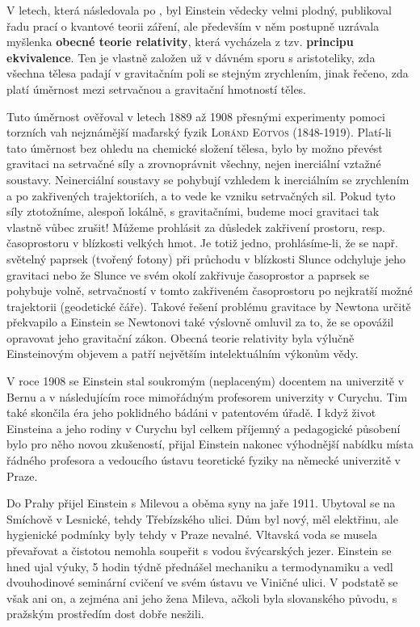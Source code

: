         V letech, která následovala po \emph{}, byl Einstein vědecky velmi
        plodný, publikoval řadu prací o kvantové teorii záření, ale především v něm postupně
        uzrávala myšlenka \textbf{obecné teorie relativity}, která vycházela z tzv. \textbf{principu
        ekvivalence}. Ten je vlastně založen už v dávném sporu s aristoteliky, zda všechna tělesa
        padají v gravitačním poli se stejným zrychlením, jinak řečeno, zda platí úměrnost mezi
        setrvačnou a gravitační hmotností těles.

        Tuto úměrnost ověřoval v letech 1889 až 1908 přesnými experimenty pomoci torzních vah
        nejznámější maďarský fyzik \textsc{Loránd Eötvös} (1848-1919). Platí-li tato úměrnost bez
        ohledu na chemické složení tělesa, bylo by možno převést gravitaci na setrvačné síly a
        zrovnoprávnit všechny, nejen inerciální vztažné soustavy. Neinerciální soustavy se pohybují
        vzhledem k inerciálním se zrychlením a po zakřivených trajektoriích, a to vede ke vzniku
        setrvačných sil. Pokud tyto síly ztotožníme, alespoň lokálně, s gravitačními, budeme moci
        gravitaci tak vlastně vůbec zrušit! Můžeme prohlásit za důsledek zakřivení prostoru, resp.
        časoprostoru v blízkosti velkých hmot. Je totiž jedno, prohlásíme-li, že se např. světelný
        paprsek (tvořený fotony) při průchodu v blízkosti Slunce odchyluje jeho gravitaci nebo že
        Slunce ve svém okolí zakřivuje časoprostor a paprsek se pohybuje volně, setrvačností v tomto
        zakřiveném časoprostoru po nejkratší možné trajektorii (geodetické čáře). Takové řešení
        problému gravitace by Newtona určitě překvapilo a Einstein se Newtonovi také výslovně
        omluvil za to, že se opovážil opravovat jeho gravitační zákon. Obecná teorie relativity byla
        výlučně Einsteinovým objevem a patří největším intelektuálním výkonům vědy.

        V roce 1908 se Einstein stal soukromým (neplaceným) docentem na univerzitě v Bernu a v
        následujícím roce mimořádným profesorem univerzity v Curychu. Tim také skončila éra jeho
        poklidného bádáni v patentovém úřadě. I když život Einsteina a jeho rodiny v Curychu byl
        celkem příjemný a pedagogické působení bylo pro něho novou zkušeností, přijal Einstein
        nakonec výhodnější nabídku místa řádného profesora a vedoucího ústavu teoretické fyziky na
        německé univerzitě v Praze.

        Do Prahy přijel Einstein s Milevou a oběma syny na jaře 1911. Ubytoval se na Smíchově v
        Lesnické, tehdy Třebízského ulici. Dům byl nový, měl elektřinu, ale hygienické podmínky byly
        tehdy v Praze nevalné. Vltavská voda se musela převařovat a čistotou nemohla soupeřit s
        vodou švýcarských jezer. Einstein se hned ujal výuky, 5 hodin týdně přednášel mechaniku a
        termodynamiku a vedl dvouhodinové seminární cvičení ve svém ústavu ve Viničné ulici. V
        podstatě se však ani on, a zejména ani jeho žena Mileva, ačkoli byla slovanského původu, s
        pražským prostředím dost dobře nesžili.

